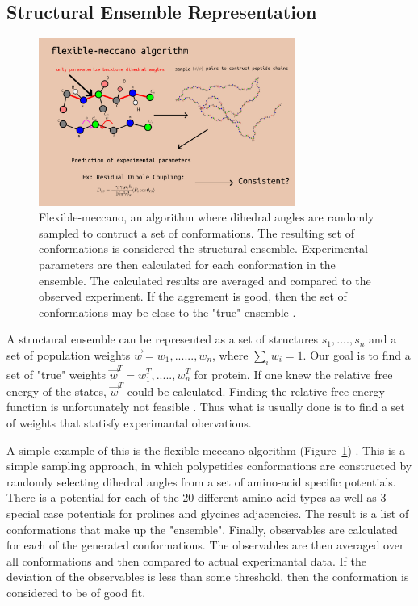 \documentclass{article}
\newcommand{\reffig}[1]{Figure~\ref{#1}}
\begin{document}
\subsection{Structural Ensemble Representation}
\begin{figure}[t]
    \centering
    \includegraphics[width=0.75\textwidth]{flexible-meccano}
    \caption{
        Flexible-meccano, an algorithm where dihedral angles are randomly sampled to contruct a set of conformations. 
        The resulting set of conformations is considered the structural ensemble.
        Experimental parameters are then calculated for each conformation in the ensemble. 
        The calculated results are averaged and compared to the observed experiment.
        If the aggrement is good, then the set of conformations may be close to the "true" ensemble \cite{ozenneFlexiblemeccanoToolGeneration2012}.
        \label{fig:flexible-meccano}
    }
\end{figure}
A structural ensemble can be represented as a set of structures ${s_1,....,s_n}$ and a set of population weights $\vec w = {w_1,......,w_n}$, where $\sum_i w_i = 1$. 
Our goal is to find a set of "true" weights $\vec w^T = {w_1^T,.....,w_n^T}$ for protein. 
If one knew the relative free energy of the states, $\vec w^T$ could be calculated.
Finding the relative free energy function is unfortunately not feasible \cite{freddolinoForceFieldBias2009}.
Thus what is usually done is to find a set of weights that statisfy experimantal obervations.

A simple example of this is the flexible-meccano algorithm (\reffig{fig:flexible-meccano}) \cite{ozenneFlexiblemeccanoToolGeneration2012}.
This is a simple sampling approach, in which polypetides conformations are constructed by randomly selecting dihedral angles from a set of amino-acid specific potentials.
There is a potential for each of the 20 different amino-acid types as well as 3 special case potentials for prolines and glycines adjacencies.
The result is a list of conformations that make up the "ensemble".
Finally, observables are calculated for each of the generated conformations.
The observables are then averaged over all conformations and then compared to actual experimantal data.
If the deviation of the observables is less than some threshold, then the conformation is considered to be of good fit.
\end{document}
